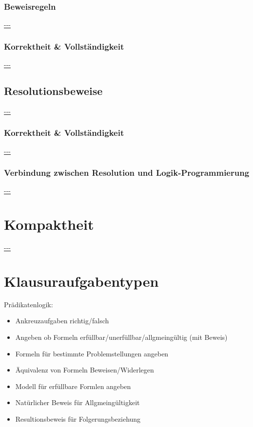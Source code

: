 \documentclass[twocolumn]{article}
\begin{document}
    \subsubsection{Beweisregeln}
    \url{---}\\

    \subsubsection{Korrektheit \& Vollständigkeit}
    \url{---}\\

    \subsection{Resolutionsbeweise}
    \url{---}\\

    \subsubsection{Korrektheit \& Vollständigkeit}
    \url{---}\\

    \subsubsection{Verbindung zwischen Resolution und Logik-Programmierung}
    \url{---}\\

    \section{Kompaktheit}
    \url{---}\\


    \section{Klausuraufgabentypen}
    Prädikatenlogik:
    \begin{itemize}
        \item Ankreuzaufgaben richtig/falsch
        \item Angeben ob Formeln erfüllbar/unerfüllbar/allgmeingültig (mit Beweis)
        \item Formeln für bestimmte Problemstellungen angeben
        \item Äquivalenz von Formeln Beweisen/Widerlegen
        \item Modell für erfüllbare Formlen angeben
        \item Natürlicher Beweis für Allgmeingültigkeit
        \item Resultionsbeweis für Folgerungsbeziehung
    \end{itemize}
\end{document}
